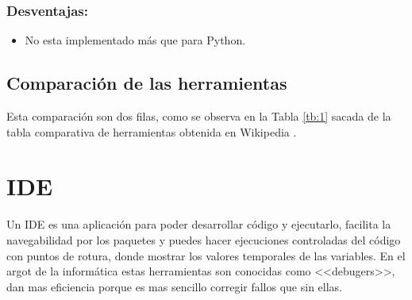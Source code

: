 \subsubsection{Desventajas:}
\begin{itemize}
\item No esta implementado más que para Python.
\end{itemize}

\subsection{Comparación de las herramientas}
Esta comparación son dos filas, como se observa en la Tabla \ref{tb:1} sacada de la tabla comparativa de herramientas obtenida en Wikipedia \cite{Template:table}.


\begin{table}[]
\centering
\caption{Tabla comparativa de herramientas}
\label{tb:1}
\end{table}
\section{IDE}
Un IDE es una aplicación para poder desarrollar código y ejecutarlo, facilita la navegabilidad por los paquetes y puedes hacer ejecuciones controladas del código con puntos de rotura, donde mostrar los valores temporales de las variables.
En el argot de la informática estas herramientas son conocidas como <<debugers>>, dan mas eficiencia porque es mas sencillo corregir fallos que sin ellas.

